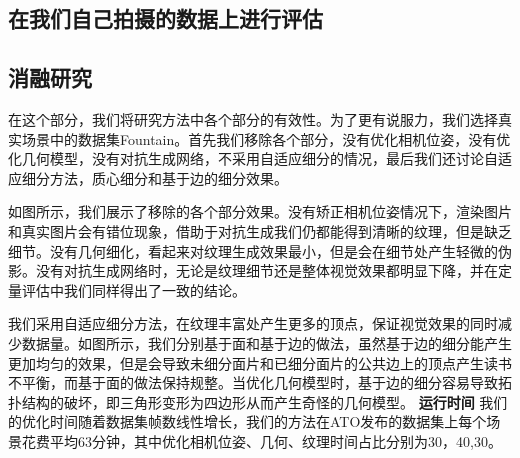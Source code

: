 \subsection{在我们自己拍摄的数据上进行评估}
\subsection{消融研究}
在这个部分，我们将研究方法中各个部分的有效性。为了更有说服力，我们选择真实场景中的数据集Fountain。首先我们移除各个部分，没有优化相机位姿，没有优化几何模型，没有对抗生成网络，不采用自适应细分的情况，最后我们还讨论自适应细分方法，质心细分和基于边的细分效果。\par
如图所示，我们展示了移除的各个部分效果。没有矫正相机位姿情况下，渲染图片和真实图片会有错位现象，借助于对抗生成我们仍都能得到清晰的纹理，但是缺乏细节。没有几何细化，看起来对纹理生成效果最小，但是会在细节处产生轻微的伪影。没有对抗生成网络时，无论是纹理细节还是整体视觉效果都明显下降，并在定量评估中我们同样得出了一致的结论。\par
我们采用自适应细分方法，在纹理丰富处产生更多的顶点，保证视觉效果的同时减少数据量。如图所示，我们分别基于面和基于边的做法，虽然基于边的细分能产生更加均匀的效果，但是会导致未细分面片和已细分面片的公共边上的顶点产生读书不平衡，而基于面的做法保持规整。当优化几何模型时，基于边的细分容易导致拓扑结构的破坏，即三角形变形为四边形从而产生奇怪的几何模型。
\noindent \textbf{运行时间}
我们的优化时间随着数据集帧数线性增长，我们的方法在ATO发布的数据集上每个场景花费平均63分钟，其中优化相机位姿、几何、纹理时间占比分别为30，40,30。

